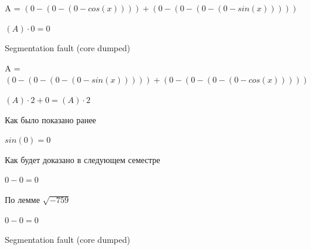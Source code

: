\documentclass[12pt,a4paper,fleqn]{article}
\begin{document}
\begin{center}
\begin{center}
\begin{center}
\begin{center}
\begin{center}
\begin{center}
\begin{center}
\begin{center}
\begin{center}
\begin{center}
\begin{center}
\begin{center}
\begin{center}
\begin{center}
\begin{center}
\begin{center}
\begin{center}
\begin{center}
\begin{center}
\begin{center}
\begin{center}
\begin{center}
\begin{center}
\begin{center}
\begin{center}
\begin{center}
\begin{center}
\begin{center}
\begin{center}
\begin{center}
\begin{center}
\begin{center}
\begin{center}
\begin{center}
\begin{center}
\begin{center}
\begin{center}
\begin{center}
\begin{center}
\begin{center}
\begin{center}
\begin{center}
\begin{center}
\begin{center}
\begin{center}
\begin{center}
\begin{center}
\begin{center}
\begin{center}
\begin{center}
\begin{center}
\begin{center}
\begin{center}
\begin{center}
\begin{center}
\begin{center}
\begin{center}
\begin{center}
\begin{center}
\begin{center}
\begin{center}
\begin{center}
\begin{center}
\begin{center}
\begin{center}
\begin{center}
\begin{center}
\begin{center}
A = $(0-(0-(0-cos(x))))+(0-(0-(0-(0-sin(x)))))$\end{center}
\begin{center}
$(A) \cdot 0 = 0$\end{center}
Segmentation fault (core dumped)

\begin{center}
A = $(0-(0-(0-(0-sin(x)))))+(0-(0-(0-(0-cos(x)))))$\end{center}
\begin{center}
$(A) \cdot 2+0 = (A) \cdot 2$\end{center}
Как было показано ранее

\begin{center}
\begin{center}$sin(0) = 0$\end{center}
Как будет доказано в следующем семестре

\begin{center}
\begin{center}$0-0 = 0$\end{center}
По лемме $\sqrt{-759}$
\begin{center}
\begin{center}$0-0 = 0$\end{center}
Segmentation fault (core dumped)


\end{center}
\end{center}
\end{center}
\end{center}
\end{center}
\end{center}
\end{center}
\end{center}
\end{center}
\end{center}
\end{center}
\end{center}
\end{center}
\end{center}
\end{center}
\end{center}
\end{center}
\end{center}
\end{center}
\end{center}
\end{center}
\end{center}
\end{center}
\end{center}
\end{center}
\end{center}
\end{center}
\end{center}
\end{center}
\end{center}
\end{center}
\end{center}
\end{center}
\end{center}
\end{center}
\end{center}
\end{center}
\end{center}
\end{center}
\end{center}
\end{center}
\end{center}
\end{center}
\end{center}
\end{center}
\end{center}
\end{center}
\end{center}
\end{center}
\end{center}
\end{center}
\end{center}
\end{center}
\end{center}
\end{center}
\end{center}
\end{center}
\end{center}
\end{center}
\end{center}
\end{center}
\end{center}
\end{center}
\end{center}
\end{center}
\end{center}
\end{center}
\end{center}
\end{center}
\end{center}
\end{document}
